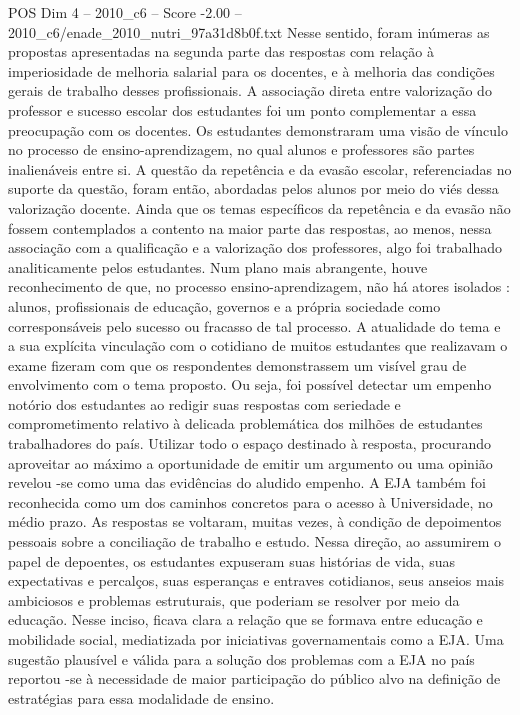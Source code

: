\begin{textsample}{POS Dim 4 – 2010\_c6 – Score -2.00 – 2010\_c6/enade\_2010\_nutri\_97a31d8b0f.txt}
Nesse sentido, foram inúmeras as propostas apresentadas na segunda parte das respostas com relação à imperiosidade de melhoria salarial para os docentes, e à melhoria das condições gerais de trabalho desses profissionais.
A associação direta entre valorização do professor e sucesso escolar dos estudantes foi um ponto complementar a essa preocupação com os docentes.
Os estudantes demonstraram uma visão de vínculo no processo de ensino-aprendizagem, no qual alunos e professores são partes inalienáveis entre si.
A questão da repetência e da evasão escolar, referenciadas no suporte da questão, foram então, abordadas pelos alunos por meio do viés dessa valorização docente.
Ainda que os temas específicos da repetência e da evasão não fossem contemplados a contento na maior parte das respostas, ao menos, nessa associação com a qualificação e a valorização dos professores, algo foi trabalhado analiticamente pelos estudantes.
Num plano mais abrangente, houve reconhecimento de que, no processo ensino-aprendizagem, não há atores isolados : alunos, profissionais de educação, governos e a própria sociedade como corresponsáveis pelo sucesso ou fracasso de tal processo.
A atualidade do tema e a sua explícita vinculação com o cotidiano de muitos estudantes que realizavam o exame fizeram com que os respondentes demonstrassem um visível grau de envolvimento com o tema proposto.
Ou seja, foi possível detectar um empenho notório dos estudantes ao redigir suas respostas com seriedade e comprometimento relativo à delicada problemática dos milhões de estudantes trabalhadores do país.
Utilizar todo o espaço destinado à resposta, procurando aproveitar ao máximo a oportunidade de emitir um argumento ou uma opinião revelou -se como uma das evidências do aludido empenho.
A EJA também foi reconhecida como um dos caminhos concretos para o acesso à Universidade, no médio prazo.
As respostas se voltaram, muitas vezes, à condição de depoimentos pessoais sobre a conciliação de trabalho e estudo.
Nessa direção, ao assumirem o papel de depoentes, os estudantes expuseram suas histórias de vida, suas expectativas e percalços, suas esperanças e entraves cotidianos, seus anseios mais ambiciosos e problemas estruturais, que poderiam se resolver por meio da educação.
Nesse inciso, ficava clara a relação que se formava entre educação e mobilidade social, mediatizada por iniciativas governamentais como a EJA.
Uma sugestão plausível e válida para a solução dos problemas com a EJA no país reportou -se à necessidade de maior participação do público alvo na definição de estratégias para essa modalidade de ensino.

\end{textsample}
